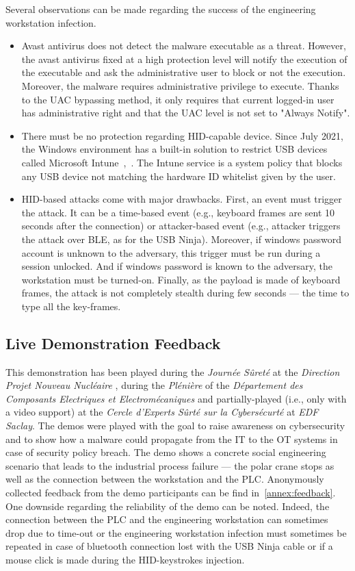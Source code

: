Several observations can be made regarding the success of the engineering workstation infection.

\begin{itemize}
    \item Avast antivirus does not detect the malware executable as a threat. However, the avast antivirus fixed at a high protection level will notify the execution of the executable and ask the administrative user to block or not the execution. Moreover, the malware requires administrative privilege to execute. Thanks to the UAC bypassing method, it only requires that current logged-in user has administrative right and that the UAC level is not set to "Always Notify". 
    \item There must be no protection regarding HID-capable device. Since July 2021, the Windows environment has a built-in solution to restrict USB devices called Microsoft Intune~\cite{intune-servie},~\cite{introduce-grp-policy}. The Intune service is a system policy that blocks any USB device not matching the hardware ID whitelist given by the user.
    \item HID-based attacks come with major drawbacks. First, an event must trigger the attack. It can be a time-based event (e.g., keyboard frames are sent 10 seconds after the connection) or attacker-based event (e.g., attacker triggers the attack over BLE, as for the USB Ninja). Moreover, if windows password account is unknown to the adversary, this trigger must be run during a session unlocked. And if windows password is known to the adversary, the workstation must be turned-on. Finally, as the payload is made of keyboard frames, the attack is not completely stealth during few seconds — the time to type all the key-frames. 
\end{itemize}

\subsection{Live Demonstration Feedback}

This demonstration has been played during the \emph{Journée Sûreté} at the \emph{Direction Projet Nouveau Nucléaire }, during the \emph{Plénière} of the \emph{Département des Composants Electriques et Electromécaniques} and partially-played (i.e., only with a video support) at the \emph{Cercle d'Experts Sûrté sur la Cybersécurté} at \emph{EDF Saclay}. The demos were played with the goal to raise awareness on cybersecurity and to show how a malware could propagate from the IT to the OT systems in case of security policy breach. The demo shows a concrete social engineering scenario that leads to the industrial process failure  — the polar crane stops as well as the connection between the workstation and the PLC. Anonymously collected feedback from the demo participants can be find in~\autoref{annex:feedback}. One downside regarding the reliability of the demo can be noted. Indeed, the connection between the PLC and the engineering workstation can sometimes drop due to time-out or the engineering workstation infection must sometimes be repeated in case of bluetooth connection lost with the USB Ninja cable or if a mouse click is made during the HID-keystrokes injection.


